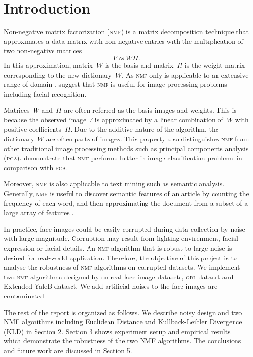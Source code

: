 \section{Introduction\label{chapter1}}
Non-negative matrix factorization (\textsc{nmf}) is a matrix decomposition technique that approximates a data matrix with non-negative entries with the multiplication of two non-negative matrices
\begin{equation*}
  V \approx WH.
\end{equation*}
In this approximation, matrix~$W$ is the basis and matrix~$H$ is the weight matrix corresponding to the new dictionary~$W$. As \textsc{nmf} only 
is applicable to an extensive range of domain . \citet{lee1999learning} suggest that \textsc{nmf} is useful for image processing problems including facial recognition.  

Matrices~$W$ and~$H$ are often referred as the basis images and weights. This is because the observed image $V$ is approximated by a linear combination of~$W$ with positive coefficients~$H$. Due to the additive nature of the algorithm, the dictionary~$W$ are often parts of images. This property also distinguishes \textsc{nmf} from other traditional image processing methods such as principal components analysis (\textsc{pca}). \citet{guillamet2002non} demonstrate that \textsc{nmf} performs better in image classification problems in comparison with \textsc{pca}.

Moreover, \textsc{nmf} is also applicable to text mining such as semantic analysis. Generally, \textsc{nmf} is useful to discover semantic features of an article by counting the frequency of each word, and then approximating the document from a subset of a large array of features \citep{lee1999learning}.

In practice, face images could be easily corrupted during data collection by noise with large magnitude. Corruption may result from lighting environment, facial expression or facial details. An \textsc{nmf} algorithm that is robust to large noise is desired for real-world application. Therefore, the objective of this project is to analyse the robustness of \textsc{nmf} algorithms on corrupted datasets. We implement two \textsc{nmf} algorithms designed by \citet{lee2001algorithms} on real face image datasets, \textsc{orl} dataset and Extended YaleB dataset. We add artificial noises to the face images are contaminated.

The rest of the report is organized as follows. We describe noisy design and two \textsc{NMF} algorithms including Euclidean Distance and Kullback-Leibler Divergence (\textsc{KLD}) in Section 2. Section 3 shows experiment setup and empirical results which demonstrate the robustness of the two NMF algorithms. The conclusions and future work are discussed in Section 5.
